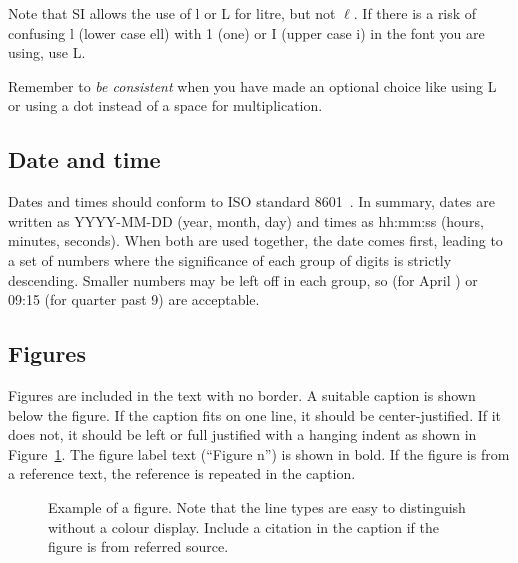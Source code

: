 \documentclass[a5paper, 10pt]{article}
\begin{document}
Note that SI allows the use of l or L for litre, but not $\ell$.
If there is a risk of confusing l (lower case ell) with 1 (one) or I (upper case i) in the font you are using, use L.

Remember to \emph{be consistent} when you have made an optional choice like using L or using a dot instead of a space for multiplication.

\subsection{Date and time}
Dates and times should conform to ISO standard 8601~\citep{isodates}.
In summary, dates are written as YYYY-MM-DD (year, month, day) and times as hh:mm:ss (hours, minutes, seconds).  
When both are used together, the date comes first, leading to a set of numbers where the significance of each group of digits is strictly descending.
Smaller numbers may be left off in each group, so \the{} (for April \the\year) or 09:15 (for quarter past 9) are acceptable.

\subsection{Figures}
Figures are included in the text with no border. 
A suitable caption is shown below the figure.
If the caption fits on one line, it should be center-justified.
If it does not, it should be left or full justified with a hanging indent as shown in Figure~\ref{fig:figexample}.
The figure label text (``Figure n'') is shown in bold.
If the figure is from a reference text, the reference is repeated in the caption.

\begin{figure}[htbp]
  \centering
  \caption{Example of a figure.  Note that the line types are easy to
    distinguish without a colour display.  Include a citation in the caption if the figure is from referred source.}
  \label{fig:figexample}
\end{figure}
\end{document}
